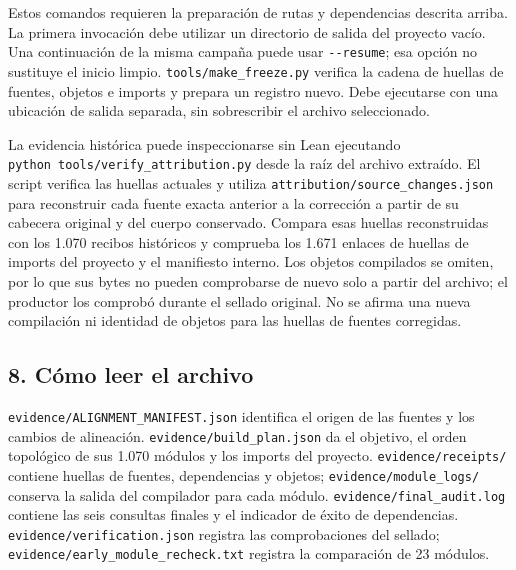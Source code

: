 \documentclass[spanish,11pt,a4paper]{article}
\begin{document}
Estos comandos requieren la preparación de rutas y dependencias descrita arriba. La primera invocación debe utilizar un directorio de salida del proyecto vacío. Una continuación de la misma campaña puede usar \texttt{-\/\allowbreak{}-resume}; esa opción no sustituye el inicio limpio. \texttt{tools/\allowbreak{}make\_\allowbreak{}freeze.\allowbreak{}py} verifica la cadena de huellas de fuentes, objetos e imports y prepara un registro nuevo. Debe ejecutarse con una ubicación de salida separada, sin sobrescribir el archivo seleccionado.

La evidencia histórica puede inspeccionarse sin Lean ejecutando \texttt{python\ tools/\allowbreak{}verify\_\allowbreak{}attribution.\allowbreak{}py} desde la raíz del archivo extraído. El script verifica las huellas actuales y utiliza \texttt{attribution/\allowbreak{}source\_\allowbreak{}changes.\allowbreak{}json} para reconstruir cada fuente exacta anterior a la corrección a partir de su cabecera original y del cuerpo conservado. Compara esas huellas reconstruidas con los 1.070 recibos históricos y comprueba los 1.671 enlaces de huellas de imports del proyecto y el manifiesto interno. Los objetos compilados se omiten, por lo que sus bytes no pueden comprobarse de nuevo solo a partir del archivo; el productor los comprobó durante el sellado original. No se afirma una nueva compilación ni identidad de objetos para las huellas de fuentes corregidas.

\subsection{8. Cómo leer el archivo}\label{cuxf3mo-leer-el-archivo}

\texttt{evidence/\allowbreak{}ALIGNMENT\_\allowbreak{}MANIFEST.\allowbreak{}json} identifica el origen de las fuentes y los cambios de alineación. \texttt{evidence/\allowbreak{}build\_\allowbreak{}plan.\allowbreak{}json} da el objetivo, el orden topológico de sus 1.070 módulos y los imports del proyecto. \texttt{evidence/\allowbreak{}receipts/\allowbreak{}} contiene huellas de fuentes, dependencias y objetos; \texttt{evidence/\allowbreak{}module\_\allowbreak{}logs/\allowbreak{}} conserva la salida del compilador para cada módulo. \texttt{evidence/\allowbreak{}final\_\allowbreak{}audit.\allowbreak{}log} contiene las seis consultas finales y el indicador de éxito de dependencias. \texttt{evidence/\allowbreak{}verification.\allowbreak{}json} registra las comprobaciones del sellado; \texttt{evidence/\allowbreak{}early\_\allowbreak{}module\_\allowbreak{}recheck.\allowbreak{}txt} registra la comparación de 23 módulos.
\end{document}
